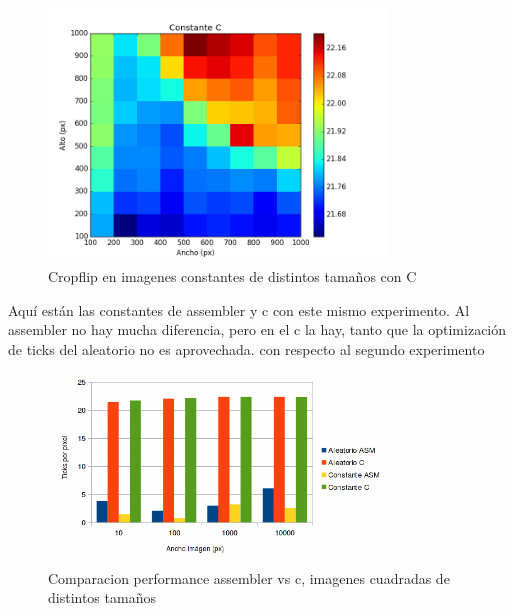  \begin{figure} [H]
  \centering
  \includegraphics[width=0.8\textwidth]{recursos/constantecropflipc.png}
    \caption{ Cropflip en imagenes constantes de distintos tamaños con C }
\end{figure}
 


Aquí están las constantes de assembler y c con este mismo experimento. Al assembler no hay mucha diferencia, pero en el c la hay, tanto que la optimización de ticks del aleatorio no es aprovechada.
\hfill \break
con respecto al segundo experimento

 \begin{figure} [H]
  \centering
  \includegraphics[width=0.8\textwidth]{recursos/cropflipexp2.png}
    \caption{ Comparacion performance assembler vs c, imagenes cuadradas de distintos tamaños  }
\end{figure}
 


